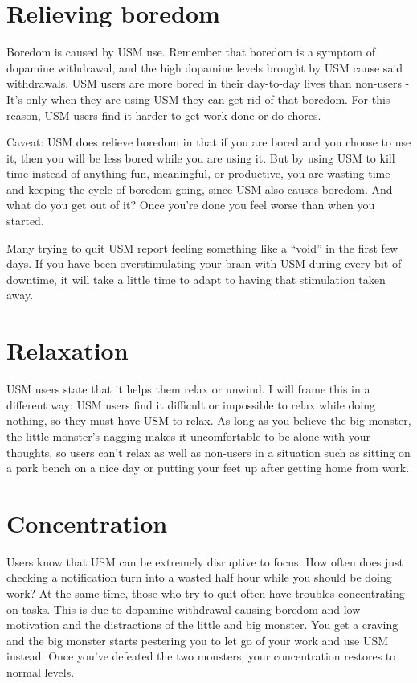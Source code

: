 \documentclass[
]{book}
\begin{document}
\section{Relieving boredom}\label{relieving-boredom}

Boredom is caused by USM use. Remember that boredom is a symptom of dopamine withdrawal, and the high dopamine levels brought by USM cause said withdrawals. USM users are more bored in their day-to-day lives than non-users - It's only when they are using USM they can get rid of that boredom. For this reason, USM users find it harder to get work done or do chores.

Caveat: USM does relieve boredom in that if you are bored and you choose to use it, then you will be less bored while you are using it. But by using USM to kill time instead of anything fun, meaningful, or productive, you are wasting time and keeping the cycle of boredom going, since USM also causes boredom. And what do you get out of it? Once you're done you feel worse than when you started.

Many trying to quit USM report feeling something like a ``void'' in the first few days. If you have been overstimulating your brain with USM during every bit of downtime, it will take a little time to adapt to having that stimulation taken away.

\section{Relaxation}\label{relaxation}

USM users state that it helps them relax or unwind. I will frame this in a different way: USM users find it difficult or impossible to relax while doing nothing, so they must have USM to relax. As long as you believe the big monster, the little monster's nagging makes it uncomfortable to be alone with your thoughts, so users can't relax as well as non-users in a situation such as sitting on a park bench on a nice day or putting your feet up after getting home from work.

\section{Concentration}\label{concentration}

Users know that USM can be extremely disruptive to focus. How often does just checking a notification turn into a wasted half hour while you should be doing work? At the same time, those who try to quit often have troubles concentrating on tasks. This is due to dopamine withdrawal causing boredom and low motivation and the distractions of the little and big monster. You get a craving and the big monster starts pestering you to let go of your work and use USM instead. Once you've defeated the two monsters, your concentration restores to normal levels.
\end{document}
